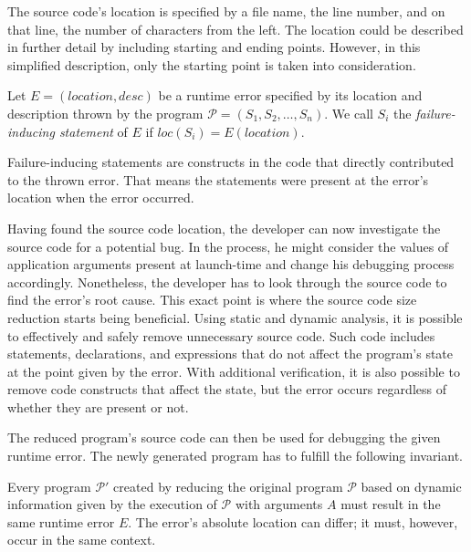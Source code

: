 The source code's location is specified by a file name, the line number, and 
on that line, the number of characters from the left.
The location could be described in further detail by including starting and 
ending points.
However, in this simplified description, only the starting point is taken 
into consideration.

\begin{defn}\label{def04:2}
  Let $E = (location, desc)$ be a runtime error specified by its location 
  and description thrown by the program $\mathcal{P} =
  (S_1, S_2, \ldots, S_n)$.
  We call $S_i$ the \emph{failure-inducing statement} of 
  $E$ if $loc(S_i) = E(location)$.
\end{defn}

Failure-inducing statements are constructs in the code that directly 
contributed to the thrown error.
That means the statements were present at the error's location when the error 
occurred.

Having found the source code location, the developer can now investigate 
the source code for a potential bug.
In the process, he might consider the values of application arguments 
present at launch-time and change his debugging process accordingly.
Nonetheless, the developer has to look through the source code to find 
the error's root cause.
This exact point is where the source code size reduction starts being 
beneficial.
Using static and dynamic analysis, it is possible to effectively and 
safely remove unnecessary source code.
Such code includes statements, declarations, and expressions that do not 
affect the program's state at the point given by the error.
With additional verification, it is also possible to remove code constructs 
that affect the state, but the error occurs regardless of whether they 
are present or not.

The reduced program's source code can then be used for debugging the given
runtime error.
The newly generated program has to fulfill the following invariant.

\begin{invar}\label{invar04:1}
  Every program $\mathcal{P'}$ created by reducing the original program 
  $\mathcal{P}$ based on dynamic information given by the execution of
  $\mathcal{P}$ with arguments $A$ must result in the same runtime error $E$.
  The error's absolute location can differ; it must, however, occur in the 
  same context.
\end{invar}

